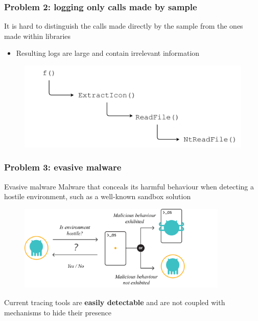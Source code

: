 \documentclass[compress]{beamer}
\begin{document}
\begin{frame}[fragile]
    \frametitle{Problem 2: logging only calls made by sample}

It is hard to distinguish the calls made directly by the sample from the ones made within libraries
\begin{itemize}
\item Resulting logs are large and contain irrelevant information
\end{itemize}

    \begin{figure}
    	\vspace{-0.2cm}
    	\hspace*{-1cm}
        \includegraphics[width=12cm]{image/MainImage1.pdf}
    \end{figure}

\end{frame}

\begin{frame}[fragile]
    \frametitle{Problem 3: evasive malware}
    
     \begin{beamerboxesrounded}[shadow=true]{Evasive malware}
Malware that conceals its harmful behaviour when detecting a
hostile environment, such as a well-known sandbox
solution
    \end{beamerboxesrounded}
    \bigskip
    \bigskip
    \begin{figure}
    	\vspace{-0.8cm}
    	\hspace*{0.5cm}
        \includegraphics[width=10cm]{image/evasive.pdf}
    \end{figure}
\vspace{-0.3cm}
Current tracing tools are \textbf{easily detectable} and are not coupled with mechanisms to hide their presence

\end{frame}
\end{document}

